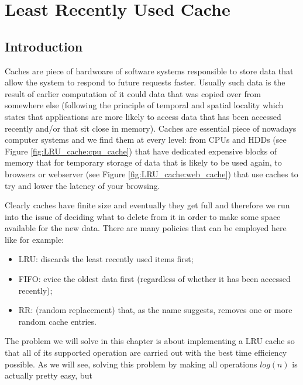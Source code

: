 %


\chapter{Least Recently Used Cache}
\label{ch:LRU_cache}
\section*{Introduction}
Caches are piece of hardwoare of software systems responsible to store data that allow the system to respond to future requests faster. Usually such data is the result of earlier computation 
of it could data that was copied over from somewhere else  (following the principle of temporal and spatial locality which states that applications are more likely to access data that has been accessed recently and/or that sit close in memory).  
Caches are essential piece of nowadays computer systems and we find them at every level: from CPUs and HDDs (see Figure \ref{fig:LRU_cache:cpu_cache}) that have dedicated expensive blocks of memory that for temporary storage of data that is likely to be used again, to 
browsers or webserver (see Figure \ref{fig:LRU_cache:web_cache}) that use caches to try and lower the latency of your browsing.


Clearly caches have finite size and eventually they get full and therefore we run into the issue of deciding what to delete from it in order to make some space available for the new data. There are many policies that can be employed here like for example:
\begin{itemize}
	\item LRU: discards the least recently used items first;
	\item FIFO: evice the oldest data first (regardless of whether it has been accessed recently);
	\item RR: (random replacement) that, as the name suggests, removes one or more random cache entries.
\end{itemize}

The problem we will solve in this chapter is about implementing a LRU cache so that all of its supported operation are carried out with the best time efficiency possible. As we will see, solving this problem by making all operations $log(n)$ is actually pretty easy, but 


